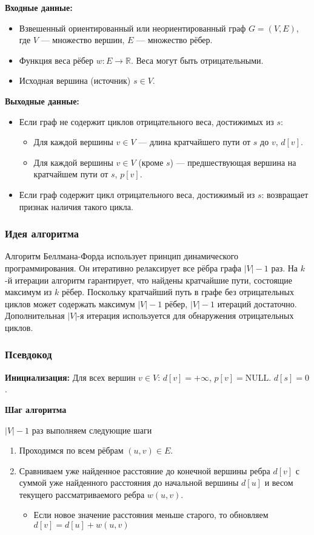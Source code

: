 \noindent \textbf{Входные данные:}
\begin{itemize}
	\item Взвешенный ориентированный или неориентированный граф $G=(V, E)$, где $V$ --- множество вершин, $E$ --- множество рёбер.
	\item Функция веса рёбер $w: E \to \mathbb{R}$. Веса могут быть отрицательными.
	\item Исходная вершина (источник) $s \in V$.
\end{itemize}

\noindent \textbf{Выходные данные:}
\begin{itemize}
	\item Если граф не содержит циклов отрицательного веса, достижимых из $s$:
	\begin{itemize}
		\item Для каждой вершины $v \in V$ --- длина кратчайшего пути от $s$ до $v$, $d[v]$.
		\item Для каждой вершины $v \in V$ (кроме $s$) --- предшествующая вершина на кратчайшем пути от $s$, $p[v]$.
	\end{itemize}
	\item Если граф содержит цикл отрицательного веса, достижимый из $s$: возвращает признак наличия такого цикла.
\end{itemize}

\subsubsection{Идея алгоритма}
Алгоритм Беллмана-Форда использует принцип динамического программирования. Он итеративно релаксирует все рёбра графа $|V|-1$ раз. На $k$-й итерации алгоритм гарантирует, что найдены кратчайшие пути, состоящие максимум из $k$ рёбер. Поскольку кратчайший путь в графе без отрицательных циклов может содержать максимум $|V|-1$ рёбер, $|V|-1$ итераций достаточно. Дополнительная $|V|$-я итерация используется для обнаружения отрицательных циклов.

\subsubsection{Псевдокод}
\textbf{Инициализация:}
Для всех вершин $v \in V$:
$d[v] = +\infty$, $p[v] = \text{NULL}$.
$d[s] = 0$.

\textbf{Шаг алгоритма }

$|V| - 1$ раз выполняем следующие шаги

\begin{enumerate}
	\item Проходимся по всем рёбрам $(u, v) \in E$.
	\item Сравниваем уже найденное расстояние до конечной вершины ребра $d[v]$ с суммой уже найденного расстояния до начальной вершины $d[u]$ и весом текущего рассматриваемого ребра $w(u, v)$.
	\begin{itemize}
		\item Если новое значение расстояния меньше старого, то обновляем $d[v] = d[u] + w(u,v)$
	\end{itemize}
\end{enumerate}

